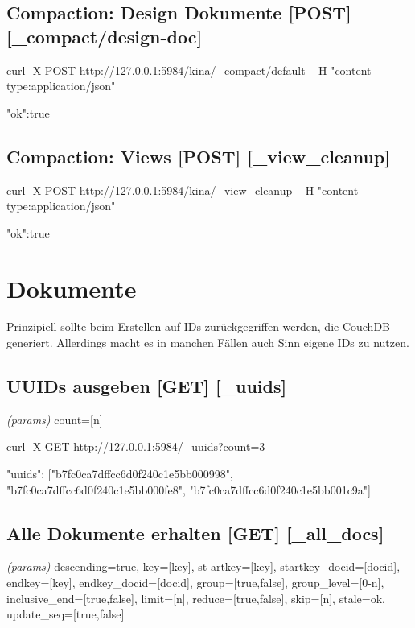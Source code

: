 \documentclass[19pt,landscape,twocolumn]{article}
\newcommand{\htmlverb}[1]{{[}\textbf{{#1}}{]}}
\newcommand{\brackets}[1]{{[}{#1}{]}}
\newcommand{\setparskip}{\setlength{\parskip}{-6mm}}
\newcommand{\resetparskip}{\setlength{\parskip}{1mm}}
\begin{document}
\subsection{Compaction: Design Dokumente \htmlverb{POST} \htmlverb{\_compact/design-doc}}

\begin{code}
curl -X POST http://127.0.0.1:5984/kina/_compact/default \
  -H "content-type:application/json"
\end{code}
\setparskip
\begin{response}
{"ok":true}
\end{response}
\resetparskip

\subsection{Compaction: Views \htmlverb{POST} \htmlverb{\_view\_cleanup}}

\begin{code}
curl -X POST http://127.0.0.1:5984/kina/_view_cleanup \
  -H "content-type:application/json"
\end{code}
\setparskip
\begin{response}
{"ok":true}
\end{response}
\resetparskip

\section{Dokumente}
Prinzipiell sollte beim Erstellen auf IDs zurückgegriffen werden, die CouchDB
generiert. Allerdings macht es in manchen Fällen auch Sinn eigene IDs zu nutzen.

\subsection{UUIDs ausgeben \htmlverb{GET} \htmlverb{\_uuids}}
\emph{(params)} count={[}n{]}

\begin{code}
curl -X GET http://127.0.0.1:5984/_uuids?count=3
\end{code}
\setparskip
\begin{response}
{"uuids":
  ["b7fc0ca7dffcc6d0f240c1e5bb000998",
   "b7fc0ca7dffcc6d0f240c1e5bb000fe8",
   "b7fc0ca7dffcc6d0f240c1e5bb001c9a"]
}
\end{response}
\resetparskip

\subsection{Alle Dokumente erhalten \htmlverb{GET} \htmlverb{\_all\_docs}}
\emph{(params)} descending=true, key=\brackets{key}, st-artkey=\brackets{key}, startkey\_docid=\brackets{docid}, \newline
endkey=\brackets{key}, endkey\_docid=\brackets{docid}, group=\brackets{true,false}, group\_level=\brackets{0-n}, \newline
inclusive\_end=\brackets{true,false}, limit=\brackets{n}, reduce=\brackets{true,false}, skip=\brackets{n}, stale=ok, \newline
update\_seq=\brackets{true,false}
\end{document}
